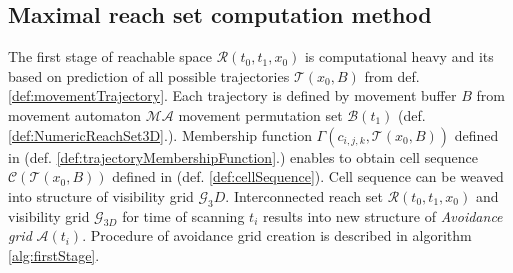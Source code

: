 \subsection{Maximal reach set computation method}\label{s:maxReachSet}
\noindent The first stage of reachable space $\mathscr{R}(t_0,t_1,x_0)$ is computational heavy and its based on prediction of all possible trajectories $\mathscr{T}(x_0,B)$ from def.\ref{def:movementTrajectory}. Each trajectory is defined by movement buffer $B$ from movement automaton $\mathscr{MA}$ movement permutation set $\mathscr{B}(t_1)$ (def. \ref{def:NumericReachSet3D}.). Membership function $\Gamma(c_{i,j,k},\mathscr{T}(x_0,B))$ defined in (def. \ref{def:trajectoryMembershipFunction}.) enables to obtain cell sequence $\mathscr{C}(\mathscr{T}(x_0,B))$ defined in (def. \ref{def:cellSequence}). Cell sequence can be weaved into structure of visibility grid $\mathscr{G}_3D$. Interconnected reach set $\mathscr{R}(t_0,t_1,x_0)$ and visibility grid $\mathscr{G}_{3D}$ for time of scanning $t_i$ results into new structure of \textit{Avoidance grid} $\mathscr{A}(t_i)$. Procedure of avoidance grid creation is described in algorithm \ref{alg:firstStage}.

